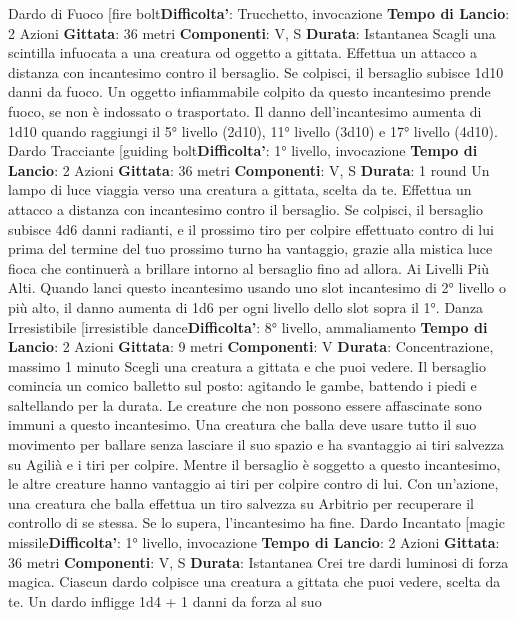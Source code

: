 \begin{multicols}{2}
Dardo di Fuoco
[fire bolt\textbf{Difficolta'}:
Trucchetto, invocazione
\textbf{Tempo di Lancio}: 2 Azioni
\textbf{Gittata}: 36 metri
\textbf{Componenti}: V, S
\textbf{Durata}: Istantanea
Scagli una scintilla infuocata a una creatura od oggetto
a gittata. Effettua un attacco a distanza con incantesimo
contro il bersaglio. Se colpisci, il bersaglio subisce 1d10
danni da fuoco. Un oggetto infiammabile colpito da
questo incantesimo prende fuoco, se non è indossato o
trasportato.
Il danno dell’incantesimo aumenta di 1d10 quando
raggiungi il 5° livello (2d10), 11° livello (3d10) e 17°
livello (4d10).
Dardo Tracciante
[guiding bolt\textbf{Difficolta'}:
1° livello, invocazione
\textbf{Tempo di Lancio}: 2 Azioni
\textbf{Gittata}: 36 metri
\textbf{Componenti}: V, S
\textbf{Durata}: 1 round
Un lampo di luce viaggia verso una creatura a gittata,
scelta da te. Effettua un attacco a distanza con
incantesimo contro il bersaglio. Se colpisci, il bersaglio
subisce 4d6 danni radianti, e il prossimo tiro per colpire
effettuato contro di lui prima del termine del tuo
prossimo turno ha vantaggio, grazie alla mistica luce
fioca che continuerà a brillare intorno al bersaglio fino
ad allora.
Ai Livelli Più Alti. Quando lanci questo incantesimo
usando uno slot incantesimo di 2° livello o più alto, il
danno aumenta di 1d6 per ogni livello dello slot sopra il
1°.
Danza Irresistibile
[irresistible dance\textbf{Difficolta'}:
8° livello, ammaliamento
\textbf{Tempo di Lancio}: 2 Azioni
\textbf{Gittata}: 9 metri
\textbf{Componenti}: V
\textbf{Durata}: Concentrazione, massimo 1 minuto
Scegli una creatura a gittata e che puoi vedere. Il
bersaglio comincia un comico balletto sul posto:
agitando le gambe, battendo i piedi e saltellando per la
durata. Le creature che non possono essere affascinate
sono immuni a questo incantesimo.
Una creatura che balla deve usare tutto il suo
movimento per ballare senza lasciare il suo spazio e ha
svantaggio ai tiri salvezza su Agilià e i tiri per
colpire. Mentre il bersaglio è soggetto a questo
incantesimo, le altre creature hanno vantaggio ai tiri per
colpire contro di lui. Con un’azione, una creatura che
balla effettua un tiro salvezza su Arbitrio per
recuperare il controllo di se stessa. Se lo supera,
l’incantesimo ha fine.
Dardo Incantato
[magic missile\textbf{Difficolta'}:
1° livello, invocazione
\textbf{Tempo di Lancio}: 2 Azioni
\textbf{Gittata}: 36 metri
\textbf{Componenti}: V, S
\textbf{Durata}: Istantanea
Crei tre dardi luminosi di forza magica. Ciascun dardo
colpisce una creatura a gittata che puoi vedere, scelta
da te. Un dardo infligge 1d4 + 1 danni da forza al suo

\end{multicols}
